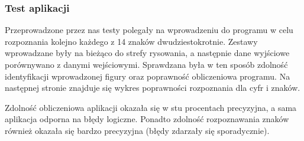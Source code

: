 \documentclass[12pt,a4paper]{article}
\begin{document}
    \subsubsection*{Test aplikacji}
    \hspace{20pt} Przeprowadzone przez nas testy polegały na wprowadzeniu do programu w celu rozpoznania kolejno każdego z 14 znaków dwudziestokrotnie. Zestawy wprowadzane były na bieżąco do strefy rysowania, a następnie dane wyjściowe porównywano z danymi wejściowymi. Sprawdzana była w ten sposób zdolność identyfikacji wprowadzonej figury oraz poprawność obliczeniowa programu. Na następnej stronie znajduje się wykres poprawności rozpoznania dla cyfr i znaków.
    \newpage
    \begin{center}
    
    \vspace{20pt}
    
    \end{center}	
	\hspace{20pt}Zdolność obliczeniowa aplikacji okazała się w stu procentach precyzyjna, a sama aplikacja odporna na błędy logiczne. Ponadto zdolność rozpoznawania znaków również okazała się bardzo precyzyjna (błędy zdarzały się sporadycznie).
	\newpage
\end{document}
